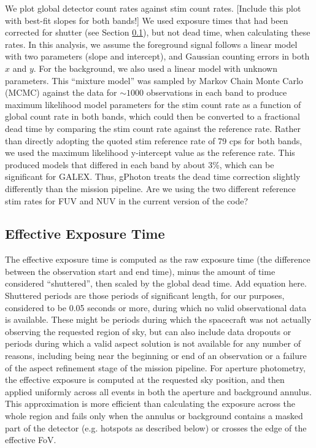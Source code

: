 \documentclass[5p]{elsarticle}
\begin{document}
We plot global detector count rates against stim count rates. {\color{red}[Include this plot with best-fit slopes for both bands!]} We used exposure times that had been corrected for shutter (see Section \ref{effexptime}), but not dead time, when calculating these rates. In this analysis, we assume the foreground signal follows a linear model with two parameters (slope and intercept), and Gaussian counting errors in both $x$ and $y$. For the background, we also used a linear model with unknown parameters. This ``mixture model'' was sampled by Markov Chain Monte Carlo (MCMC) against the data for $\sim 1000$ observations in each band to produce maximum likelihood model parameters for the stim count rate as a function of global count rate in both bands, which could then be converted to a fractional dead time by comparing the stim count rate against the reference rate. Rather than directly adopting the quoted stim reference rate of 79 cps for both bands, we used the maximum likelihood y-intercept value as the reference rate. This produced models that differed in each band by about 3\%, which can be significant for GALEX.  Thus, gPhoton treats the dead time correction slightly differently than the mission pipeline.  {\color{red}Are we using the two different reference stim rates for FUV and NUV in the current version of the code?}

\subsection{Effective Exposure Time}
\label{effexptime}
The effective exposure time is computed as the raw exposure time (the difference between the observation start and end time), minus the amount of time considered ``shuttered'', then scaled by the global dead time.  {\color{red}Add equation here.} Shuttered periods are those periods of significant length, for our purposes, considered to be 0.05 seconds or more, during which no valid observational data is available. These might be periods during which the spacecraft was not actually observing the requested region of sky, but can also include data dropouts or periods during which a valid aspect solution is not available for any number of reasons, including being near the beginning or end of an observation or a failure of the aspect refinement stage of the mission pipeline.  For aperture photometry, the effective exposure is computed at the requested sky position, and then applied uniformly across all events in both the aperture and background annulus. This approximation is more efficient than calculating the exposure across the whole region and fails only when the annulus or background contains a masked part of the detector (e.g. hotspots as described below) or crosses the edge of the effective FoV.
\end{document}
